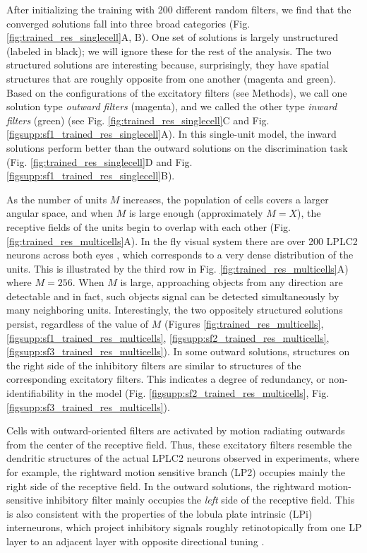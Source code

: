 \documentclass[pdftex,9pt,lineno]{elife}
\begin{document}
After initializing the training with 200 different random filters, we find that the converged solutions fall into three broad categories (Fig. \ref{fig:trained_res_singlecell}A, B). One set of solutions is largely unstructured (labeled in black); we will ignore these for the rest of the analysis. The two structured solutions are interesting because, surprisingly, they have  spatial structures that are roughly opposite from one another (magenta and green). Based on the configurations of the excitatory filters (see Methods), we call one solution type \textit{outward filters}   (magenta), and we called the other type \textit{inward filters} (green) (see Fig. \ref{fig:trained_res_singlecell}C and Fig. \ref{figsupp:sf1_trained_res_singlecell}A). In this single-unit model, the inward solutions perform better than the outward solutions on the discrimination task (Fig. \ref{fig:trained_res_singlecell}D and Fig. \ref{figsupp:sf1_trained_res_singlecell}B).

As the number of units $M$ increases, the population of cells covers a larger angular space, and when $M$ is large enough (approximately $M=X$), the receptive fields of the units begin to overlap with each other (Fig. \ref{fig:trained_res_multicells}A). In the fly visual system there are over 200 LPLC2 neurons across both eyes \citep{ache2019neural}, which corresponds to a very dense distribution of the units. This is illustrated by the third row in Fig. \ref{fig:trained_res_multicells}A) where $M=256$. When $M$ is large, approaching objects from any direction are detectable and in fact, such objects signal can be detected simultaneously by many neighboring units. Interestingly, the two oppositely structured solutions persist, regardless of the value of $M$ (Figures \ref{fig:trained_res_multicells},  \ref{figsupp:sf1_trained_res_multicells}, \ref{figsupp:sf2_trained_res_multicells},  \ref{figsupp:sf3_trained_res_multicells}). In some outward solutions, structures on the right side of the inhibitory filters are similar to structures of the corresponding excitatory filters. This indicates a degree of redundancy, or non-identifiability in the model (Fig. \ref{figsupp:sf2_trained_res_multicells}, Fig. \ref{figsupp:sf3_trained_res_multicells}).

Cells with outward-oriented filters are activated by motion radiating outwards from the center of the receptive field. Thus, these excitatory filters resemble the dendritic structures of the actual LPLC2 neurons observed in experiments, where for example, the rightward motion sensitive branch (LP2) occupies mainly the right side of the receptive field. In the outward solutions, the rightward motion-sensitive inhibitory filter mainly occupies the \textit{left} side of the receptive field. This is also consistent with the properties of the lobula plate intrinsic (LPi) interneurons, which project inhibitory signals roughly retinotopically from one LP layer to an adjacent layer with opposite directional tuning \citep{mauss2015neural,klapoetke2017ultra}.
\end{document}
